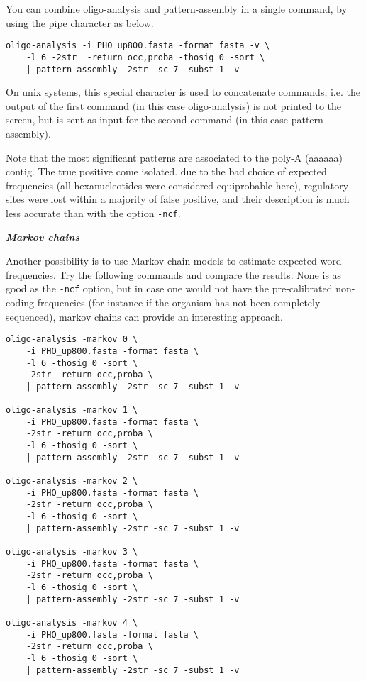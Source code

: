 You can combine oligo-analysis and pattern-assembly in a single
command, by using the pipe character as below.

\begin{verbatim}
oligo-analysis -i PHO_up800.fasta -format fasta -v \
    -l 6 -2str  -return occ,proba -thosig 0 -sort \
    | pattern-assembly -2str -sc 7 -subst 1 -v
\end{verbatim}

On unix systems, this special character is used to concatenate
commands, i.e. the output of the first command (in this case
oligo-analysis) is not printed to the screen, but is sent as input for
the second command (in this case pattern-assembly).

Note that the most significant patterns are associated to the poly-A
(aaaaaa) contig. The true positive come isolated. due to the bad
choice of expected frequencies (all hexanucleotides were considered
equiprobable here), regulatory sites were lost within a majority of
false positive, and their description is much less accurate than with
the option \texttt{-ncf}.

\textit{\textbf{Markov chains}}

Another possibility is to use Markov chain models to estimate expected
word frequencies. Try the following commands and compare the
results. None is as good as the \texttt{-ncf} option, but in case one
would not have the pre-calibrated non-coding frequencies (for instance
if the organism has not been completely sequenced), markov chains can
provide an interesting approach.

\begin{verbatim}
oligo-analysis -markov 0 \
    -i PHO_up800.fasta -format fasta \
    -l 6 -thosig 0 -sort \
    -2str -return occ,proba \
    | pattern-assembly -2str -sc 7 -subst 1 -v

oligo-analysis -markov 1 \
    -i PHO_up800.fasta -format fasta \
    -2str -return occ,proba \
    -l 6 -thosig 0 -sort \
    | pattern-assembly -2str -sc 7 -subst 1 -v
	
oligo-analysis -markov 2 \
    -i PHO_up800.fasta -format fasta \
    -2str -return occ,proba \
    -l 6 -thosig 0 -sort \
    | pattern-assembly -2str -sc 7 -subst 1 -v
	
oligo-analysis -markov 3 \
    -i PHO_up800.fasta -format fasta \
    -2str -return occ,proba \
    -l 6 -thosig 0 -sort \
    | pattern-assembly -2str -sc 7 -subst 1 -v
	
oligo-analysis -markov 4 \
    -i PHO_up800.fasta -format fasta \
    -2str -return occ,proba \
    -l 6 -thosig 0 -sort \
    | pattern-assembly -2str -sc 7 -subst 1 -v
\end{verbatim}

